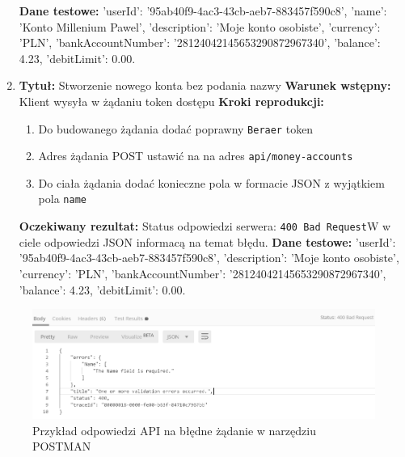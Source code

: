 \begin{enumerate}[labelwidth=1em,label=\Roman*]
    \textbf{Dane testowe:} 'userId': '95ab40f9-4ac3-43cb-aeb7-883457f590c8', 'name': 'Konto Millenium Pawel', 'description': 'Moje konto osobiste', 'currency': 'PLN', 'bankAccountNumber': '28124042145653290872967340', 'balance': 4.23, 'debitLimit': 0.00.
\item 
    \textbf{Tytuł:} Stworzenie nowego konta bez podania nazwy \newline
    \textbf{Warunek wstępny:} Klient wysyła w żądaniu token dostępu \newline
    \textbf{Kroki reprodukcji:}  \begin{enumerate}[label=\arabic*.]
        \item Do budowanego żądania dodać poprawny \texttt{Beraer} token 
        \item Adres żądania POST ustawić na na adres \texttt{api/money-accounts}
        \item Do ciała żądania dodać konieczne pola w formacie JSON z wyjątkiem pola \texttt{name}
    \end{enumerate}
    \textbf{Oczekiwany rezultat:}  Status odpowiedzi serwera: \texttt{400 Bad Request}W w ciele odpowiedzi JSON informacą na temat błędu. \newline
    \textbf{Dane testowe:} 'userId': '95ab40f9-4ac3-43cb-aeb7-883457f590c8', 'description': 'Moje konto osobiste', 'currency': 'PLN', 'bankAccountNumber': '28124042145653290872967340', 'balance': 4.23, 'debitLimit': 0.00.
\end{enumerate}

\begin{figure}[t]
	\centering
	\includegraphics[width=.8\linewidth]{rys05/api-error.png}
	\caption{Przykład odpowiedzi API na błędne żądanie w narzędziu POSTMAN}
	\label{fig:api-test-1}
\end{figure}